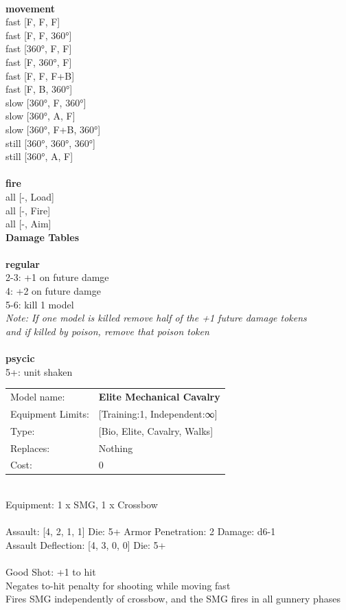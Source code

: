 {\ \\ {\bf movement } \\
fast [F, F, F] \\
fast [F, F, 360°] \\
fast [360°, F, F] \\
fast [F, 360°, F] \\
fast [F, F, F+B] \\
fast [F, B, 360°] \\
slow [360°, F, 360°] \\
slow [360°, A, F] \\
slow [360°, F+B, 360°] \\
still [360°, 360°, 360°] \\
still [360°, A, F] \\
\ \\ {\bf fire } \\
all [-, Load] \\
all [-, Fire] \\
all [-, Aim] \\


{\bf Damage Tables} \\
\ \\ {\bf regular } \\
2-3: +1 on future damge \\
4: +2 on future damge \\
5-6: kill 1 model \\
{{\it Note: If one model is killed remove half of the +1 future damage tokens \\ and if killed by poison, remove that poison token}} \\
\ \\ {\bf psycic } \\
5+: unit shaken \\


\noindent
\begin{tabular}{ll}
Model name: &{\bf Elite Mechanical Cavalry } \\
Equipment Limits: &[Training:1, Independent:∞] \\
Type: &[Bio, Elite, Cavalry, Walks] \\
Replaces: &Nothing \\
Cost: & 0\\
\end{tabular}
\ \\
Equipment: 1 x SMG, 1 x Crossbow \\
\ \\
Assault: [4, 2, 1, 1] Die: 5+ Armor Penetration: 2 Damage: d6-1 \\
Assault Deflection: [4, 3, 0, 0] Die: 5+\\
\indent  
\ \\
Good Shot: +1 to hit\\ 
Negates to-hit penalty for shooting while moving fast\\ 
Fires SMG independently of crossbow, and the SMG fires in all gunnery phases\\ 

}
